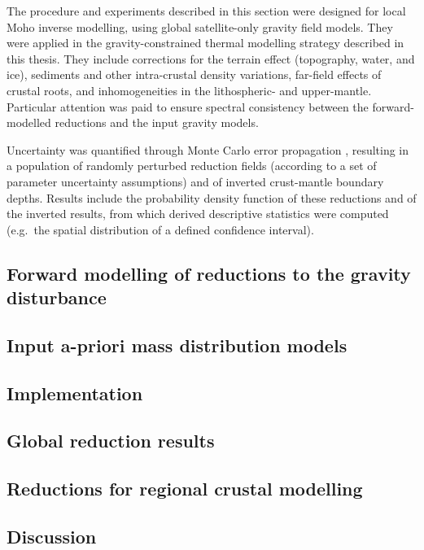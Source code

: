 The procedure and experiments described in this section were designed for local Moho inverse modelling, using global satellite-only gravity field models.
They were applied in the gravity-constrained thermal modelling strategy described in this thesis.
They include corrections for the terrain effect (topography, water, and ice), sediments and other intra-crustal density variations, far-field effects of crustal roots, and inhomogeneities in the lithospheric- and upper-mantle.
Particular attention was paid to ensure spectral consistency between the forward-modelled reductions and the input gravity models.

Uncertainty was quantified through Monte Carlo error propagation \parencite{Aster2018}, resulting in a population of randomly perturbed reduction fields (according to a set of parameter uncertainty assumptions) and of inverted crust-mantle boundary depths.
Results include the probability density function of these reductions and of the inverted results, from which derived descriptive statistics were computed (e.g.~the spatial distribution of a defined confidence interval).

\newpage

\subsection{Forward modelling of reductions to the gravity disturbance}



\subsection{Input a-priori mass distribution models}

\subsection{Implementation}

\subsection{Global reduction results}

\subsection{Reductions for regional crustal modelling}

\subsection{Discussion}


